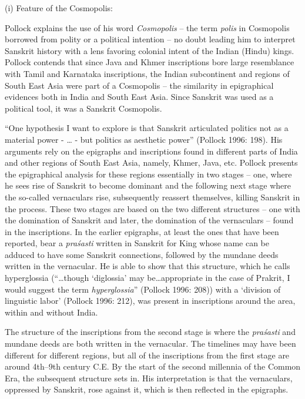 (i) Feature of the Cosmopolis:

Pollock explains the use of his word \textit{Cosmopolis} – the term \textit{polis} in Cosmopolis borrowed from polity or a political intention – no doubt leading him to interpret Sanskrit history with a lens favoring colonial intent of the Indian (Hindu) kings. Pollock contends that since Java and Khmer inscriptions bore large resemblance with Tamil and Karnataka inscriptions, the Indian subcontinent and regions of South East Asia were part of a Cosmopolis – the similarity in epigraphical evidences both in India and South East Asia. Since Sanskrit was used as a political tool, it was a Sanskrit Cosmopolis.

“One hypothesis I want to explore is that Sanskrit articulated politics not as a material power - … - but politics as aesthetic power” (Pollock 1996: 198). His arguments rely on the epigraphs and inscriptions found in different parts of India and other regions of South East Asia, namely, Khmer, Java, etc. Pollock presents the epigraphical analysis for these regions essentially in two stages – one, where he sees rise of Sanskrit to become dominant and the following next stage where the so-called vernaculars rise, subsequently reassert themselves, killing Sanskrit in the process. These two stages are based on the two different structures – one with the domination of Sanskrit and later, the domination of the vernaculars – found in the inscriptions. In the earlier epigraphs, at least the ones that have been reported, bear a \textit{praśasti} written in Sanskrit for King whose name can be adduced to have some Sanskrit connections, followed by the mundane deeds written in the vernacular. He is able to show that this structure, which he calls hyperglossia (“…though ‘diglossia’ may be…appropriate in the case of Prakrit, I would suggest the term \textit{hyperglossia}” (Pollock 1996: 208)) with a ‘division of linguistic labor’ (Pollock 1996: 212), was present in inscriptions around the area, within and without India.

The structure of the inscriptions from the second stage is where the \textit{praśasti} and mundane deeds are both written in the vernacular. The timelines may have been different for different regions, but all of the inscriptions from the first stage are around 4th--9th century C.E. By the start of the second millennia of the Common Era, the subsequent structure sets in. His interpretation is that the vernaculars, oppressed by Sanskrit, rose against it, which is then reflected in the epigraphs.

